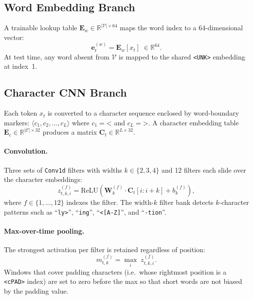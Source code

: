 \documentclass[11pt]{article}
\begin{document}
\subsection{Word Embedding Branch}

A trainable lookup table $\mathbf{E}_w \in \mathbb{R}^{|\mathcal{V}| \times 64}$
maps the word index to a 64-dimensional vector:
\begin{equation}
  \mathbf{e}_t^{(w)} = \mathbf{E}_w[x_t] \;\in \mathbb{R}^{64}.
\end{equation}
At test time, any word absent from $\mathcal{V}$ is mapped to the shared
\texttt{<UNK>} embedding at index~1.

\subsection{Character CNN Branch}

Each token $x_t$ is converted to a character sequence enclosed by
word-boundary markers: $\langle c_1, c_2, \ldots, c_L \rangle$ where
$c_1 = \texttt{<}$ and $c_L = \texttt{>}$.  A character embedding table
$\mathbf{E}_c \in \mathbb{R}^{|\mathcal{C}| \times 32}$ produces a matrix
$\mathbf{C}_t \in \mathbb{R}^{L \times 32}$.

\paragraph{Convolution.}
Three sets of \texttt{Conv1d} filters with widths $k \in \{2, 3, 4\}$ and
12 filters each slide over the character embeddings:
\begin{equation}
  z_{t,k,i}^{(f)} = \mathrm{ReLU}\!\left(
    \mathbf{W}_k^{(f)} \cdot \mathbf{C}_t[i:i{+}k] + b_k^{(f)}
  \right),
\end{equation}
where $f \in \{1,\ldots,12\}$ indexes the filter.  The width-$k$ filter bank
detects $k$-character patterns such as ``\texttt{ly>}'', ``\texttt{ing}'',
``\texttt{<[A-Z]}'', and ``\texttt{-tion}''.

\paragraph{Max-over-time pooling.}
The strongest activation per filter is retained regardless of position:
\begin{equation}
  m_{t,k}^{(f)} = \max_i\; z_{t,k,i}^{(f)}.
\end{equation}
Windows that cover padding characters (i.e.\ whose rightmost position is a
\texttt{<cPAD>} index) are set to zero before the max so that short words
are not biased by the padding value.
\end{document}
